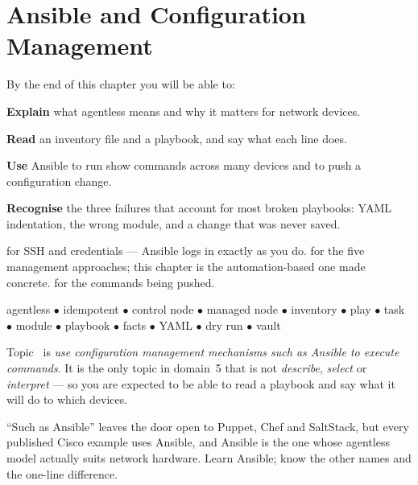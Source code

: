 \chapter{Ansible and Configuration Management}\label{ch:ansible}

\begin{outcomes}
By the end of this chapter you will be able to:
\begin{tight}
  \item \textbf{Explain} what agentless means and why it matters for network
        devices.
  \item \textbf{Read} an inventory file and a playbook, and say what each line
        does.
  \item \textbf{Use} Ansible to run show commands across many devices and to push
        a configuration change.
  \item \textbf{Recognise} the three failures that account for most broken
        playbooks: YAML indentation, the wrong module, and a change that was
        never saved.
\end{tight}
\end{outcomes}

\begin{prereq}
 for SSH and credentials --- Ansible logs in exactly as you do.
 for the five management approaches; this chapter is the
automation-based one made concrete.  for the commands being pushed.
\end{prereq}

\begin{keyterms}
agentless $\bullet$ idempotent $\bullet$ control node $\bullet$ managed node
$\bullet$ inventory $\bullet$ play $\bullet$ task $\bullet$ module $\bullet$
playbook $\bullet$ facts $\bullet$ YAML $\bullet$ dry run $\bullet$ vault
\end{keyterms}

\begin{examnote}
Topic~ is \emph{use configuration management mechanisms such as Ansible
to execute commands}. It is the only topic in domain~5 that is not
\emph{describe}, \emph{select} or \emph{interpret} --- so you are expected to be
able to read a playbook and say what it will do to which devices.

``Such as Ansible'' leaves the door open to Puppet, Chef and SaltStack, but every
published Cisco example uses Ansible, and Ansible is the one whose agentless
model actually suits network hardware. Learn Ansible; know the other names and
the one-line difference.
\end{examnote}

